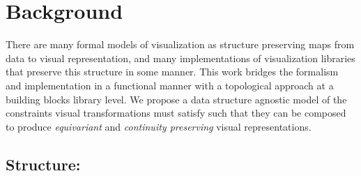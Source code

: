 \documentclass[../main.tex]{subfiles}
\begin{document}
\section{Background}
There are many formal models of visualization as structure preserving maps from data to visual representation, and many implementations of visualization libraries that preserve this structure in some manner. This work bridges the formalism and implementation in a functional manner with a topological approach at a building blocks library level. We propose a data structure agnostic model of the constraints visual transformations must satisfy such that they can be composed to produce \textit{equivariant} and \textit{continuity preserving} visual representations. 

\subsection{Structure:}
\label{sec:intro:structure}
\end{document}
